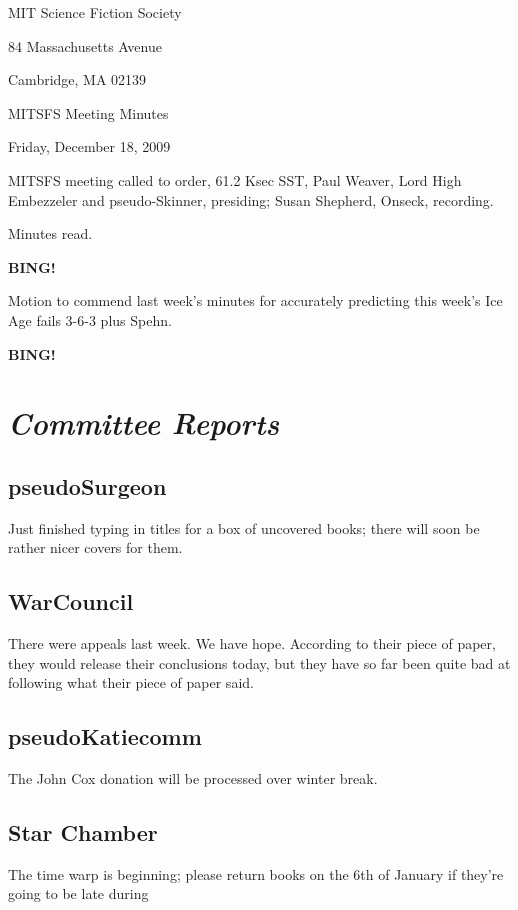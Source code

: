 \documentclass[10pt]{article}
\newcommand{\bing}{{\bf BING!} }
\newcommand{\goto}[1]{\bing \vskip 12pt \section*{{\em{#1}}}}
\newcommand{\ps}{ plus Spehn\xspace}
\newcommand{\skinner}{Paul Weaver, Lord High Embezzeler and pseudo-Skinner}
\newcommand{\onseck}{Susan Shepherd, Onseck}
\newcommand{\meetingdate}{Friday, December 18, 2009}
\begin{document}
\begin{center}

MIT Science Fiction Society

84 Massachusetts Avenue

Cambridge, MA 02139

\vspace{12pt}

MITSFS Meeting Minutes

\meetingdate

\end{center}

\vspace{18pt}

\setlength{\parskip}{6pt}

\noindent
MITSFS meeting called to order, 61.2 Ksec SST,
\skinner, presiding; \onseck, recording.

Minutes read.

\bing

Motion to commend last week's minutes for accurately predicting this week's Ice Age fails 3-6-3\ps.

\goto{Committee Reports}

\subsection*{pseudoSurgeon}
Just finished typing in titles for a box of uncovered books; there will soon be rather nicer covers for them.

\subsection*{WarCouncil}
There were appeals last week. We have hope. According to their piece of paper, they would release their conclusions today, but they have so far been quite bad at following what their piece of paper said.

\subsection*{pseudoKatiecomm}
The John Cox donation will be processed over winter break.

\subsection*{Star Chamber}
The time warp is beginning; please return books on the 6th of January if they're going to be late during 
\end{document}
